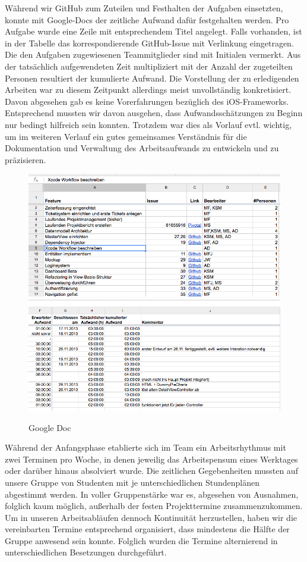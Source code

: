	Während wir GitHub zum Zuteilen und Festhalten der Aufgaben einsetzten, konnte mit Google-Docs der zeitliche Aufwand dafür festgehalten werden. Pro Aufgabe wurde eine Zeile mit entsprechendem Titel angelegt. Falls vorhanden, ist in der Tabelle das korrespondierende GitHub-Issue mit Verlinkung eingetragen. Die den Aufgaben zugewiesenen Teammitglieder sind mit Initialen vermerkt. Aus der tatsächlich aufgewendeten Zeit multipliziert mit der Anzahl der zugeteilten Personen resultiert der kumulierte Aufwand. Die Vorstellung der zu erledigenden Arbeiten war zu diesem Zeitpunkt allerdings meist unvollständig konkretisiert. Davon abgesehen gab es keine Vorerfahrungen bezüglich des iOS-Frameworks. Entsprechend mussten wir davon ausgehen, dass Aufwandsschätzungen zu Beginn nur bedingt hilfreich sein konnten. Trotzdem war dies als Vorlauf evtl. wichtig, um im  weiteren Verlauf ein gutes gemeinsames Verständnis für die Dokumentation und Verwaltung des Arbeitsaufwands zu entwickeln und zu präzisieren. 

\begin{figure}[h]
	\centering
	\includegraphics[scale=.25]{Pictures/gdocs1} \\
	\includegraphics[scale=.25]{Pictures/gdocs2}
	\caption{Google Doc\label{fig:GDoc}}
\end{figure}

	Während der Anfangsphase etablierte sich im Team ein Arbeitsrhythmus mit zwei Terminen pro Woche, in denen jeweilig das Arbeitspensum eines Werktages oder darüber hinaus absolviert wurde.  Die zeitlichen Gegebenheiten mussten auf unsere Gruppe von Studenten mit je unterschiedlichen Stundenplänen abgestimmt werden. In voller Gruppenstärke war es, abgesehen von Ausnahmen, folglich kaum möglich, außerhalb der festen Projekttermine zusammenzukommen. Um in unseren Arbeitsabläufen dennoch Kontinuität herzustellen, haben wir die vereinbarten Termine entsprechend organisiert, dass mindestens die Hälfte der Gruppe anwesend sein konnte. Folglich wurden die Termine alternierend in unterschiedlichen Besetzungen durchgeführt. 

